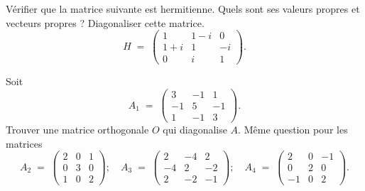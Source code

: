 \documentclass[12pt,french,oneside,a4paper]{memoir} %
\begin{document}
\begin{exo}
Vérifier que la matrice suivante est hermitienne.  Quels sont ses valeurs propres et vecteurs propres ? Diagonaliser cette matrice.
\begin{equation*}
H \;=\; \left( \begin{array}{ccc}
1 &1-i &0 \\
1+i &1 &-i \\
0 &i &1 \end{array} \right).
\end{equation*}
\end{exo}

\begin{exo}
Soit 
\begin{equation*}
A_1 \;=\; \left( \begin{array}{rrr}
3 &-1 &1 \\
-1 &5 &-1 \\
1 &-1 &3 \end{array} \right).
\end{equation*}
Trouver une matrice orthogonale $O$ qui diagonalise $A$. 
Même question pour les matrices
\begin{equation*}
A_2 \;=\; \left( \begin{array}{ccc}
2 &0 &1 \\
0 &3 &0 \\
1 &0 &2 \end{array} \right); \quad 
A_3 \;=\; \left( \begin{array}{ccc}
2 &-4 &2 \\
-4 &2 &-2 \\
2 &-2 &-1 \end{array} \right); \quad
A_4 \;=\; \left( \begin{array}{ccc}
2 &0 &-1 \\
0 &2 &0 \\
-1 &0 &2
\end{array} \right). 
\end{equation*}
\end{exo}
\end{document}
